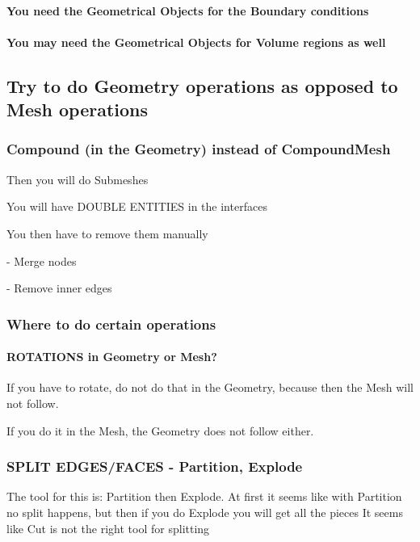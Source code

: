 \documentclass[10pt]{book}
\begin{document}
  \paragraph{You need the Geometrical Objects for the Boundary conditions}
 
  \paragraph{You may need the Geometrical Objects for Volume regions as well}
  
  
  
  \subsection{Try to do Geometry operations as opposed to Mesh operations}
 
 
  \subsubsection{Compound (in the Geometry) instead of CompoundMesh}
 
  Then you will do Submeshes
  
  You will have DOUBLE ENTITIES in the interfaces
  
  You then have to remove them manually
  
  
  - Merge nodes
  
  - Remove inner edges
  
  
  
  
 \subsubsection{Where to do certain operations}
 
  \paragraph{ROTATIONS in Geometry or Mesh?}


If you have to rotate, do not do that in the Geometry, because then the Mesh will not follow.

If you do it in the Mesh, the Geometry does not follow either.

\subsubsection{SPLIT EDGES/FACES - Partition, Explode}


The tool for this is: Partition then Explode. At first it seems like with Partition no split happens, but then if you do Explode you will get all the pieces
It seems like Cut is not the right tool for splitting
\end{document}
